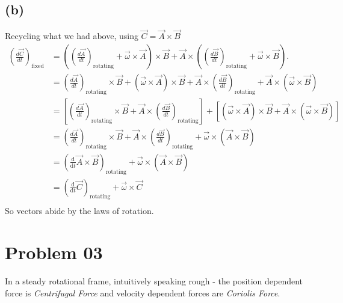 \documentclass[letter, 10pts]{article}
\begin{document}
\subsection*{(b)}
Recycling what we had above, using $\vec{C} = \vec{A} \times \vec{B}$ 
\begin{align*}
	\left( \frac{d\vec{C}}{dt} \right)_{\text{fixed}} &= \left( \left( \frac{d\vec{A}}{dt} \right)_{\text{rotating}} + \vec{\omega} \times \vec{A} \right) \times \vec{B} + \vec{A} \times \left( \left( \frac{d\vec{B}}{dt} \right)_{\text{rotating}} + \vec{\omega} \times \vec{B} \right).
\\
							  &= \left( \frac{d\vec{A}}{dt} \right)_{\text{rotating}} \times \vec{B} + (\vec{\omega} \times \vec{A}) \times \vec{B} + \vec{A} \times \left( \frac{d\vec{B}}{dt} \right)_{\text{rotating}} + \vec{A} \times (\vec{\omega} \times \vec{B})
							  \\ &= 
							  \left[ \left( \frac{d\vec{A}}{dt} \right)_{\text{rotating}} \times \vec{B} + \vec{A} \times \left( \frac{d\vec{B}}{dt} \right)_{\text{rotating}} \right] + \left[ (\vec{\omega} \times \vec{A}) \times \vec{B} + \vec{A} \times (\vec{\omega} \times \vec{B}) \right]
\\
							     &= \left( \frac{d\vec{A}}{dt} \right)_{\text{rotating}} \times \vec{B} + \vec{A} \times \left( \frac{d\vec{B}}{dt} \right)_{\text{rotating}} + \vec{\omega} \times (\vec{A} \times \vec{B}) \tag{check appendix for proof}\\
							     &= \left( \frac{\mathrm{d} }{\mathrm{d} t} \vec{A} \times \vec{B} \right)_{\text{rotating}} + \vec{\omega} \times (\vec{A} \times \vec{B}) \\ 
							     &= 
							     \left(\frac{\mathrm{d} }{\mathrm{d} t} \vec{C}\right)_\text{rotating} + \vec{\omega} \times \vec{C}\\
\end{align*}
So vectors abide by the laws of rotation. 







\section*{Problem 03}
In a  steady rotational frame, intuitively speaking rough - the position dependent force is \emph{Centrifugal Force} and velocity dependent forces are  \emph{Coriolis Force}.  
\end{document}
